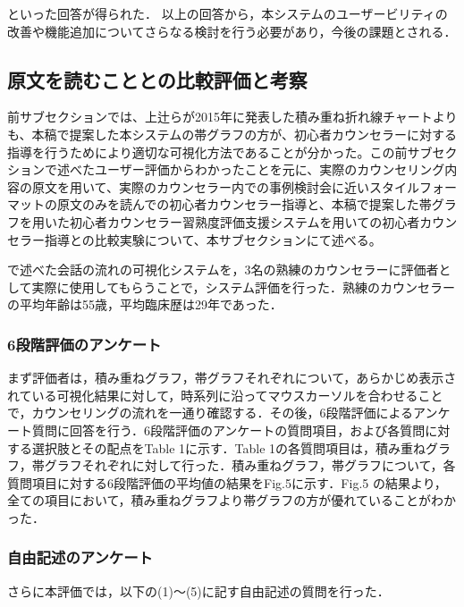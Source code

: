 \documentclass[shuuron]{kuee}
\begin{document}

といった回答が得られた．
以上の回答から，本システムのユーザービリティの　改善や機能追加についてさらなる検討を行う必要があり，今後の課題とされる．

\subsection{原文を読むこととの比較評価と考察}




前サブセクションでは、上辻らが2015年に発表した積み重ね折れ線チャートよりも、本稿で提案した本システムの帯グラフの方が、初心者カウンセラーに対する指導を行うためにより適切な可視化方法であることが分かった。この前サブセクションで述べたユーザー評価からわかったことを元に、実際のカウンセリング内容の原文を用いて、実際のカウンセラー内での事例検討会に近いスタイルフォーマットの原文のみを読んでの初心者カウンセラー指導と、本稿で提案した帯グラフを用いた初心者カウンセラー習熟度評価支援システムを用いての初心者カウンセラー指導との比較実験について、本サブセクションにて述べる。

で述べた会話の流れの可視化システムを，3名の熟練のカウンセラーに評価者として実際に使用してもらうことで，システム評価を行った．熟練のカウンセラーの平均年齢は55歳，平均臨床歴は29年であった．

\subsubsection{6段階評価のアンケート}

まず評価者は，積み重ねグラフ，帯グラフそれぞれについて，あらかじめ表示されている可視化結果に対して，時系列に沿ってマウスカーソルを合わせることで，カウンセリングの流れを一通り確認する．その後，6段階評価によるアンケート質問に回答を行う．6段階評価のアンケートの質問項目，および各質問に対する選択肢とその配点をTable 1に示す．Table 1の各質問項目は，積み重ねグラフ，帯グラフそれぞれに対して行った．積み重ねグラフ，帯グラフについて，各質問項目に対する6段階評価の平均値の結果をFig.5に示す．Fig.5 の結果より，全ての項目において，積み重ねグラフより帯グラフの方が優れていることがわかった．

\subsubsection{自由記述のアンケート}


さらに本評価では，以下の(1)～(5)に記す自由記述の質問を行った．
\end{document}
